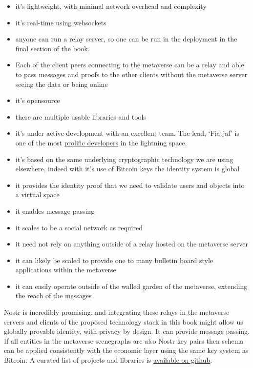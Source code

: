 \begin{itemize}
\item it's lightweight, with minimal network overhead and complexity
\item it's real-time using websockets
\item anyone can run a relay server, so one can be run in the deployment in the final section of the book.
\item Each of the client peers connecting to the metaverse can be a relay and able to pass messages and proofs to the other clients without the metaverse server seeing the data or being online 
\item it's opensource
\item there are multiple usable libraries and tools
\item it's under active development with an excellent team. The lead, `Fiatjaf' is one of the most \href{https://github.com/fiatjaf}{prolific developers} in the lightning space.
\item it's based on the same underlying cryptographic technology we are using elsewhere, indeed with it's use of Bitcoin keys the identity system is global
\item it provides the identity proof that we need to validate users and objects into a virtual space
\item it enables message passing
\item it scales to be a social network as required
\item it need not rely on anything outside of a relay hosted on the metaverse server
\item it can likely be scaled to provide one to many bulletin board style applications within the metaverse
\item it can easily operate outside of the walled garden of the metaverse, extending the reach of the messages
\end{itemize} 
Nostr is incredibly promising, and integrating these relays in the metaverse servers and clients of the proposed technology stack in this book might allow us globally provable identity, with privacy by design. It can provide message passing. If all entities in the metaverse scenegraphs are also Nostr key pairs then schema can be applied consistently with the economic layer using the same key system as Bitcoin. A curated list of projects and libraries is \href{https://github.com/aljazceru/awesome-nostr}{available on github}.\par
